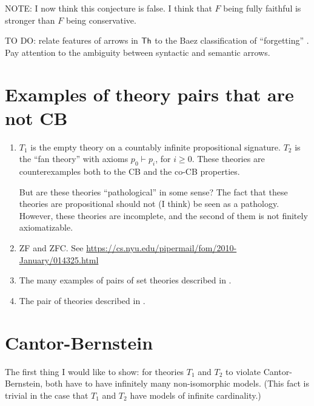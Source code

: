 \documentclass[12pt]{article}
\theoremstyle{definition}
\theoremstyle{remark}
\newcommand{\3}{\mathcal}
\begin{document}
NOTE: I now think this conjecture is false. I think that $F$ being
fully faithful is stronger than $F$ being conservative.

\bigskip TO DO: relate features of arrows in $\mathsf{Th}$ to the Baez
classification of ``forgetting''
\citep{forget,weatherall2016,barrett2020}. Pay attention to the
ambiguity between syntactic and semantic arrows.

\section{Examples of theory pairs that are not CB}


\begin{enumerate}
\item $T_1$ is the empty theory on a countably infinite propositional
  signature. $T_2$ is the ``fan theory'' with axioms $p_0\vdash p_i$,
  for $i\geq 0$. These theories are counterexamples both to the CB and
  the co-CB properties.

  But are these theories ``pathological'' in some sense? The fact that
  these theories are propositional should not (I think) be seen as a
  pathology. However, these theories are incomplete, and the second of
  them is not finitely axiomatizable.
\item ZF and ZFC. See
  \url{https://cs.nyu.edu/pipermail/fom/2010-January/014325.html}
\item The many examples of pairs of set theories described in \citep[p
  8]{hamkins}.
\item The pair of theories described in \citep{andreka}.
\end{enumerate}

\section{Cantor-Bernstein}

The first thing I would like to show: for theories $T_1$ and $T_2$ to
violate Cantor-Bernstein, both have to have infinitely many
non-isomorphic models. (This fact is trivial in the case that $T_1$
and $T_2$ have models of infinite cardinality.)
\end{document}
